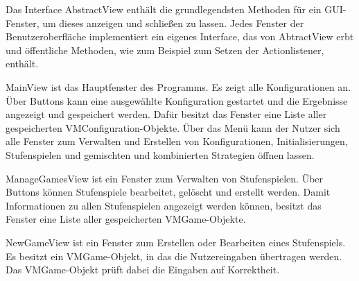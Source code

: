 Das Interface AbstractView enthält die grundlegendsten Methoden für ein GUI-Fenster, um dieses anzeigen und schließen zu lassen. Jedes Fenster der Benutzeroberfläche implementiert ein eigenes Interface, das von AbtractView erbt und öffentliche Methoden, wie zum Beispiel zum Setzen der Actionlistener, enthält.

MainView ist das Hauptfenster des Programms. Es zeigt alle Konfigurationen an. Über Buttons kann eine ausgewählte Konfiguration gestartet und die Ergebnisse angezeigt und gespeichert werden. Dafür besitzt das Fenster eine Liste aller gespeicherten VMConfiguration-Objekte.
Über das Menü kann der Nutzer sich alle Fenster zum Verwalten und Erstellen von Konfigurationen, Initialisierungen, Stufenspielen und gemischten und kombinierten Strategien öffnen lassen.

ManageGamesView ist ein Fenster zum Verwalten von Stufenspielen. Über Buttons können Stufenspiele bearbeitet, gelöscht und erstellt werden. Damit Informationen zu allen Stufenspielen angezeigt werden können, besitzt das Fenster eine Liste aller gespeicherten VMGame-Objekte. 

NewGameView ist ein Fenster zum Erstellen oder Bearbeiten eines Stufenspiels. Es besitzt ein VMGame-Objekt, in das die Nutzereingaben übertragen werden. Das VMGame-Objekt prüft dabei die Eingaben auf Korrektheit. 

